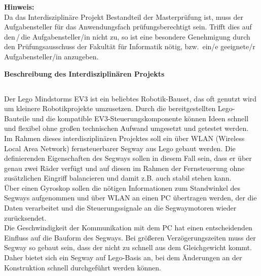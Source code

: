 \documentclass[german,11pt,a4paper]{netforms}
\begin{document}
	\vspace{\baselineskip}
	{
		\footnotesize
		\textbf{Hinweis:}\\
		Da das Interdisziplin\"are Projekt Bestandteil der Masterpr\"ufung ist,
		muss der Aufgabensteller f\"ur das Anwendungsfach pr\"ufungsberechtigt
		sein.
		Trifft dies auf den\,/\,die Aufgabensteller/in nicht zu, so ist eine
		besondere Genehmigung durch den Pr\"ufungsausschuss der Fakult\"at
		f\"ur Informatik n\"otig, bzw.\ ein/e geeignete/r Aufgabensteller/in
		anzugeben.
	}




\newpage
{}
\pagestyle{scrheadings}
\chead{\TUMheader{1cm}}


\begin{center}
	\vspace*{5mm}
	\textbf{Beschreibung des Interdisziplinären Projekts}%

	\Large%
	\textbf{\thetitlegerman}%
\end{center}



\subsection*{}
Der Lego Mindstorms EV3 ist ein beliebtes Robotik-Bauset, das oft genutzt wird um kleinere Robotikprojekte umzusetzen. Durch die bereitgestellten Lego-Bauteile und die kompatible EV3-Steuerungskomponente können Ideen schnell und flexibel ohne großen technischen Aufwand umgesetzt und getestet werden. \\

Im Rahmen dieses interdisziplinären Projektes soll ein über WLAN (Wireless Local Area Network) fernsteuerbarer Segway aus Lego gebaut werden. Die definierenden Eigenschaften des Segways sollen in diesem Fall sein, dass er über genau zwei Räder verfügt und auf diesen im Rahmen der Fernsteuerung ohne zusätzlichen Eingriff balancieren und damit z.B. auch stabil stehen kann.\\

Über einen Gyroskop sollen die nötigen Informationen zum Standwinkel des Segways aufgenommen und über WLAN an einen PC übertragen werden, der die Daten verarbeitet und die Steuerungssignale an die Segwaymotoren wieder zurücksendet. \\

Die Geschwindigkeit der Kommunikation mit dem PC hat einen entscheidenden Einfluss auf die Bauform des Segways. Bei größeren Verzögerungszeiten muss der Segway so gebaut sein, dass der nicht zu schnell aus dem Gleichgewicht kommt. Daher bietet sich ein Segway auf Lego-Basis an, bei dem Änderungen an der Konstruktion schnell durchgeführt werden können. \\
\end{document}
